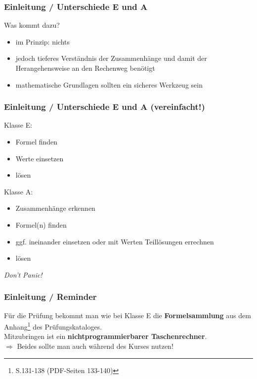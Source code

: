 \begin{frame}
\end{frame}

\begin{frame}
  \frametitle{Einleitung / Unterschiede E und A}

  Was kommt dazu? \\[1em]

  \begin{itemize}
    \item im Prinzip: nichts
    \item jedoch tieferes Verständnis der Zusammenhänge und damit der
      Herangehensweise an den Rechenweg benötigt
    \item mathematische Grundlagen sollten ein sicheres Werkzeug sein
  \end{itemize}

\end{frame}

\begin{frame}
  \frametitle{Einleitung / Unterschiede E und A (vereinfacht!)}

  \vspace{1em}
  Klasse E:

  \begin{itemize}
    \item Formel finden
    \item Werte einsetzen
    \item lösen
  \end{itemize}

  \pause

  Klasse A:

  \begin{itemize}
    \item Zusammenhänge erkennen
    \item Formel(n) finden
    \item ggf. ineinander einsetzen oder mit Werten Teillösungen errechnen
    \item lösen
  \end{itemize}

  \pause

  \begin{center}\Large \emph{Don't Panic!}\end{center}

\end{frame}

\begin{frame}
  \frametitle{Einleitung / Reminder}

  Für die Prüfung bekommt man wie bei Klasse E die
  \textbf{Formelsammlung}\hyperlink{refs}{\cite{mat}} aus dem
  Anhang\footnote{S.131-138 (PDF-Seiten 133-140)} des Prüfungskataloges.\\[1em]

  Mitzubringen ist ein \textbf{nichtprogrammierbarer Taschenrechner}. \\[3em]

  $\Rightarrow$ Beides sollte man auch während des Kurses nutzen!

\end{frame}

